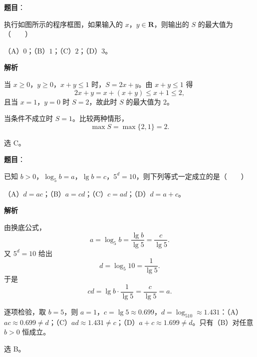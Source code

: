 \begin{answer}

\textbf{题目}：

执行如图所示的程序框图，如果输入的 $x$，$y\in\mathbf R$，则输出的 $S$ 的最大值为\mbox{（　　）}

（A）$0$；（B）$1$；（C）$2$；（D）$3$。
\nopagebreak[4]
\begin{center}\end{center}
\nopagebreak[4]
\textbf{解析}

当 $x\geqslant 0$，$y\geqslant 0$，$x+y\leqslant 1$ 时，$S=2x+y$。由 $x+y\leqslant 1$ 得
\nopagebreak[4]
\[2x+y=x+(x+y)\leqslant x+1\leqslant 2,\]
且当 $x=1$，$y=0$ 时 $S=2$，故此时 $S$ 的最大值为 $2$。

当条件不成立时 $S=1$。比较两种情形，
\nopagebreak[4]
\[\max S=\max\{2,1\}=2 .\]

选 C。


\end{answer}
\begin{answer}

\textbf{题目}：

已知 $b>0$，$\log_5 b=a$，$\lg b=c$，$5^d=10$，则下列等式一定成立的是\mbox{（　　）}

（A）$d=ac$；（B）$a=cd$；（C）$c=ad$；（D）$d=a+c$。

\textbf{解析}

由换底公式，
\nopagebreak[4]
\[a=\log_5 b=\frac{\lg b}{\lg 5}=\frac{c}{\lg 5}.\]
又 $5^d=10$ 给出
\nopagebreak[4]
\[d=\log_5 10=\frac{1}{\lg 5}.\]
于是
\nopagebreak[4]
\[cd=\lg b\cdot\frac1{\lg 5}=\frac{c}{\lg 5}=a .\]

逐项检验，取 $b=5$，则 $a=1$，$c=\lg5\approx0.699$，$d=\log_510\approx1.431$：（A）$ac\approx0.699\neq d$；（C）$ad\approx1.431\neq c$；（D）$a+c\approx1.699\neq d$。只有（B）对任意 $b>0$ 恒成立。

选 B。


\end{answer}
